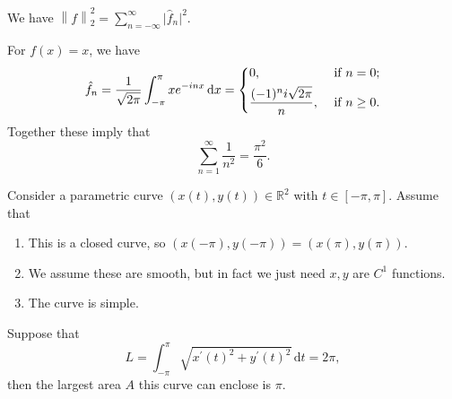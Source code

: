 \begin{eg}\label{eg:Plancherel-identity}
	We have \(\left\lVert f\right\rVert _2^2 = \sum\limits_{n=-\infty}^\infty \vert \hat{f}_n \vert ^2\).
\end{eg}
\begin{explanation}
	For \(f(x) = x\), we have
	\[
		\hat{f}_n = \frac{1}{\sqrt{2\pi}}\int_{-\pi}^\pi x e^{-inx} \,\mathrm{d}x = \begin{dcases}
			0,                            & \text{ if } n=0 ;     \\
			\frac{(-1)^ni\sqrt{2\pi}}{n}, & \text{ if } n\geq 0 .
		\end{dcases}
	\]
	Together these imply that
	\[
		\sum_{n=1}^\infty \frac{1}{n^2} = \frac{\pi^2}{6}.
	\]
\end{explanation}
\begin{eg}
	Consider a parametric curve \((x(t),y(t)) \in \mathbb{R}^2\) with \(t \in [-\pi,\pi]\). Assume that
	\begin{enumerate}[(1)]
		\item This is a closed curve, so \((x(-\pi),y(-\pi)) = (x(\pi),y(\pi))\).
		\item We assume these are smooth, but in fact we just need \(x,y\) are \(C^1\) functions.
		\item The curve is simple.
	\end{enumerate}
	Suppose that
	\[
		L = \int_{-\pi}^\pi \sqrt{x^\prime(t)^2 + y^\prime(t)^2}  \,\mathrm{d}t = 2\pi,
	\]
	then the largest area \(A\) this curve can enclose is \(\pi \).
\end{eg}
